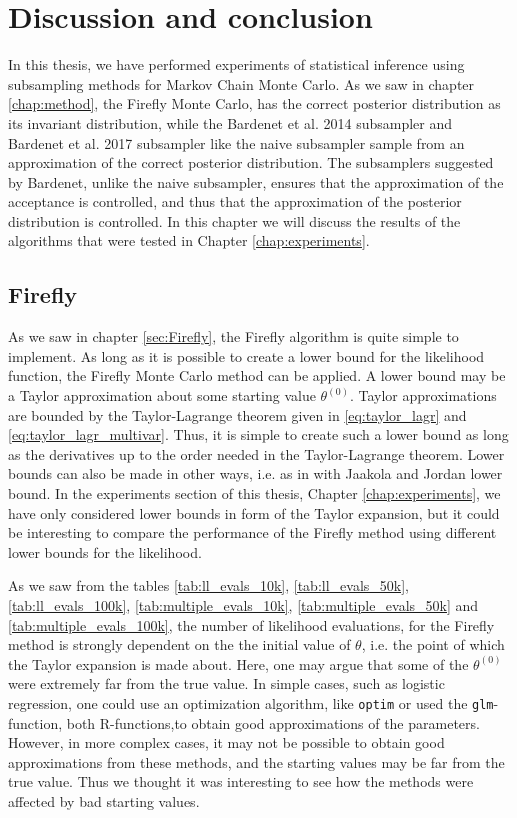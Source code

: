 \chapter{Discussion and conclusion}
In this thesis, we have performed experiments of statistical inference using subsampling methods for Markov Chain Monte Carlo. As we saw in chapter \ref{chap:method}, the Firefly Monte Carlo, has the correct posterior distribution as its invariant distribution, while the Bardenet et al. 2014 subsampler and Bardenet et al. 2017 subsampler like the naive subsampler sample from an approximation of the correct posterior distribution. The subsamplers suggested by Bardenet, unlike the naive subsampler, ensures that the approximation of the acceptance is controlled, and thus that the approximation of the posterior distribution is controlled.  In this chapter we will discuss the results of the algorithms that were tested in Chapter \ref{chap:experiments}. 

\section{Firefly}
As we saw in chapter \ref{sec:Firefly}, the Firefly algorithm is quite simple to implement. As long as it is possible to create a lower bound for the likelihood function, the Firefly Monte Carlo method can be applied. A lower bound may be a Taylor approximation about some starting value $\theta^{\left(0\right)}$.  Taylor approximations are bounded by the Taylor-Lagrange theorem given in  \eqref{eq:taylor_lagr} and \eqref{eq:taylor_lagr_multivar}. Thus, it is simple to create such a lower bound as long as the derivatives up to the order needed in the Taylor-Lagrange theorem. Lower bounds can also be made in other ways, i.e. as in  \cite{Maclaurin:1} with Jaakola and Jordan lower bound. In the experiments section of this thesis, Chapter \ref{chap:experiments}, we have only considered lower bounds in form of the Taylor expansion, but it could be interesting to compare the performance of the Firefly method using different lower bounds for the likelihood.

As we saw from the tables \ref{tab:ll_evals_10k}, \ref{tab:ll_evals_50k}, \ref{tab:ll_evals_100k}, \ref{tab:multiple_evals_10k}, \ref{tab:multiple_evals_50k} and \ref{tab:multiple_evals_100k},  the number of  likelihood evaluations, for the Firefly method is strongly dependent on the the initial value of $\theta$, i.e. the point of which the Taylor expansion is made about.
Here, one may argue that some of the $\theta^{\left(0\right)}$ were extremely far from the true value. In simple cases, such as logistic regression, one could use an optimization algorithm, like \texttt{optim} or used the \texttt{glm}-function, both R-functions,to obtain good approximations of the parameters. 
However, in more complex cases, it may not be possible to obtain good approximations from these methods, and the starting values may be far from the true value. 
Thus we thought it was interesting to see how the methods were affected by bad starting values. 

